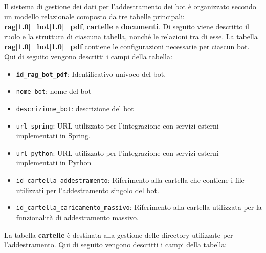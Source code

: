 \documentclass[a4paper,twoside,12pt]{toptesi}
\begin{document}

Il sistema di gestione dei dati per l'addestramento dei bot è organizzato secondo un modello relazionale composto da tre tabelle principali: \textbf{rag\scalebox{0.5}[1.0]{\_}bot\scalebox{0.5}[1.0]{\_}pdf}, \textbf{cartelle} e \textbf{documenti}. Di seguito viene descritto il ruolo e la struttura di ciascuna tabella, nonché le relazioni tra di esse. La tabella \textbf{rag\scalebox{0.5}[1.0]{\_}bot\scalebox{0.5}[1.0]{\_}pdf} contiene le configurazioni necessarie per ciascun bot. Qui di seguito vengono descritti i campi della tabella:

\begin{itemize}
\item \textbf{\textnormal{\lstinline|id_rag_bot_pdf|}}: Identificativo univoco del bot.
\item \textnormal{\lstinline|nome_bot|}: nome del bot
\item \textnormal{\lstinline|descrizione_bot|}: descrizione del bot
\item \textnormal{\lstinline|url_spring|}: URL utilizzato per l'integrazione con servizi esterni implementati in Spring.
\item \textnormal{\lstinline|url_python|}: URL utilizzato per l'integrazione con servizi esterni implementati in Python
\item \textnormal{\lstinline|id_cartella_addestramento|}: Riferimento alla cartella che contiene i file utilizzati per l'addestramento singolo del bot.
\item \textnormal{\lstinline|id_cartella_caricamento_massivo|}: Riferimento alla cartella utilizzata per la funzionalità di addestramento massivo.
\end{itemize}

La tabella \textbf{cartelle} è destinata alla gestione delle directory utilizzate per l'addestramento. Qui di seguito vengono descritti i campi della tabella:
\end{document}
